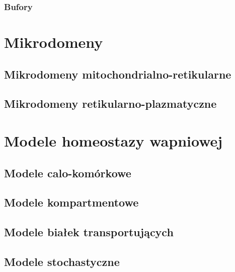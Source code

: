 	\subsubsection{Bufory}


\section{Mikrodomeny}

	\subsection{Mikrodomeny mitochondrialno-retikularne}
	\subsection{Mikrodomeny retikularno-plazmatyczne}

\section{Modele homeostazy wapniowej}

\subsection{Modele calo-komórkowe}

\subsection{Modele kompartmentowe}

\subsection{Modele białek transportujących}

\subsection{Modele stochastyczne}